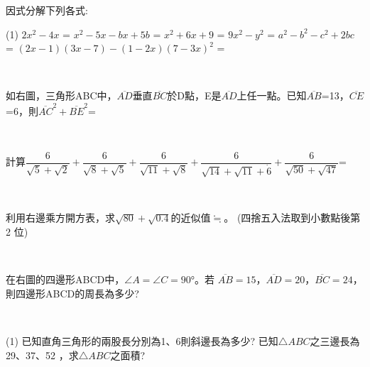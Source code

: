 \documentclass
[answers]
{exam}
\newcommand\ul[1]{\uline{\hspace*{#1}}}
\theoremstyle{definition}
\newif\ifyr\yrfalse %
\newcommand{\yr}[1]{\ifyr\relax\else #1\fi}
\newif\ifsho\shofalse %
\newcommand{\sho}[1]{\ifsho\relax\else\rightline{【#1】}\fi}
\begin{document}
\begin{questions}
\begin{solution}
\end{solution}

\question
因式分解下列各式:
\begin{tasks}(1)
	\task $2x^2-4x$ = \ul{50pt}
	\task $x^2-5x-bx+5b$ = \ul{50pt}
	\task $x^2+6x+9$ = \ul{50pt}
	\task $9x^2-y^2$ = \ul{50pt}
	\task $a^2-b^2-c^2+2bc$ = \ul{50pt}
	\task $\left(2x-1\right)\left(3x-7\right)-\left(1-2x\right)\left(7-3x\right)^2$ = \ul{50pt}
\end{tasks}
\begin{solution}~\\
	
\end{solution}

\question
如右圖，三角形ABC中，$\overline{AD}$垂直$\overline{BC}$於D點，E是$\overline{AD}$上任一點。已知$\overline{AB}$=13，$\overline{CE}$ =6，則$\overline{AC}^2+ \overline{BE}^2$=
\ul{50pt}
\begin{solution}~\\
	
\end{solution}

\question
計算$\dfrac{6}{\sqrt{5}+\sqrt{2}}+\dfrac{6}{\sqrt{8}+\sqrt{5}}+\dfrac{6}{\sqrt{11}+\sqrt{8}}+\dfrac{6}{\sqrt{14}+\sqrt{11}+\dot{6}}+\dfrac{6}{\sqrt{50}+\sqrt{47}}$=
\ul{50pt}
\begin{solution}~\\
	
\end{solution}

\question
利用右邊乘方開方表，求$\sqrt{80}+\sqrt{0.4}$的近似值$\fallingdotseq$\ul{50pt}。 (四捨五入法取到小數點後第 2 位)
\begin{solution}~\\
	
\end{solution}

\question
在右圖的四邊形ABCD中，$\angle A=\angle C=90°$。若 $\overline{AB} =15$，$\overline{AD} =20$，$\overline{BC}=24$，則四邊形ABCD的周長為多少?
\begin{solution}~\\
	
\end{solution}

\question
\begin{tasks}(1)
	\task 已知直角三角形的兩股長分別為1、6則斜邊長為多少?
	\task 已知$\triangle ABC$之三邊長為29、37、52 ，求$\triangle ABC$之面積?
\end{tasks}
\begin{solution}~\\
	
\end{solution}





\end{questions}
\end{document}

